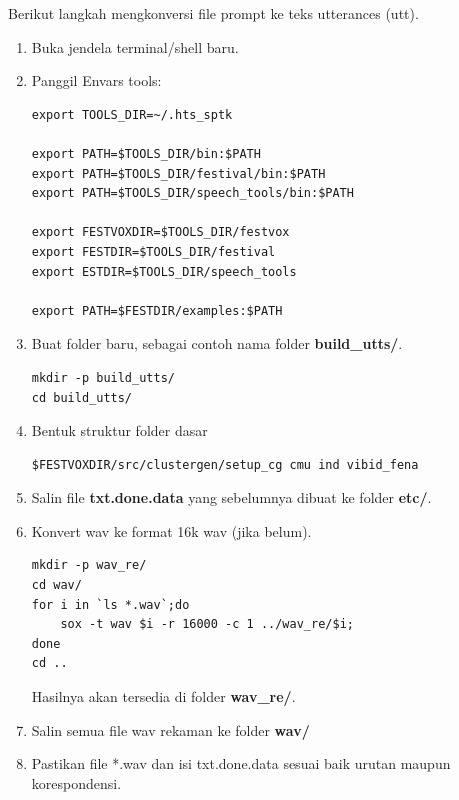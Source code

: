 \documentclass[12pt,]{article}
\begin{document}
	Berikut langkah mengkonversi file prompt ke teks utterances (utt).
	
	\begin{enumerate}
		\item Buka jendela terminal/shell baru.
		
		\item Panggil Envars tools:
		\begin{verbatim}
export TOOLS_DIR=~/.hts_sptk

export PATH=$TOOLS_DIR/bin:$PATH
export PATH=$TOOLS_DIR/festival/bin:$PATH
export PATH=$TOOLS_DIR/speech_tools/bin:$PATH

export FESTVOXDIR=$TOOLS_DIR/festvox
export FESTDIR=$TOOLS_DIR/festival
export ESTDIR=$TOOLS_DIR/speech_tools

export PATH=$FESTDIR/examples:$PATH
		\end{verbatim}
		
		\item Buat folder baru, sebagai contoh nama folder \textbf{build\_utts/}.
		\begin{verbatim}
mkdir -p build_utts/
cd build_utts/
		\end{verbatim}
		
		\item Bentuk struktur folder dasar
		\begin{verbatim}
$FESTVOXDIR/src/clustergen/setup_cg cmu ind vibid_fena
		\end{verbatim}
		
		\item Salin file \textbf{txt.done.data} yang sebelumnya dibuat ke folder \textbf{etc/}.
		
		\item Konvert wav ke format 16k wav (jika belum).
		\begin{verbatim}
mkdir -p wav_re/
cd wav/
for i in `ls *.wav`;do
	sox -t wav $i -r 16000 -c 1 ../wav_re/$i;
done
cd ..
		\end{verbatim}
		
		Hasilnya akan tersedia di folder \textbf{wav\_re/}.
		
		\item Salin semua file wav rekaman ke folder \textbf{wav/}
		
		\item Pastikan file *.wav dan isi txt.done.data sesuai baik urutan maupun korespondensi.
		

\end{enumerate}
\end{document}
